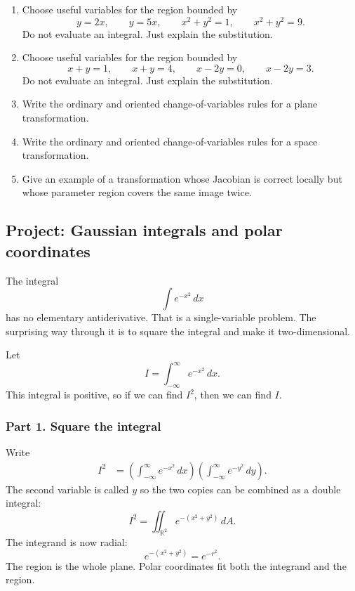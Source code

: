 \begin{enumerate}
\item Choose useful variables for the region bounded by
\[
    y=2x,\qquad y=5x,\qquad x^2+y^2=1,\qquad x^2+y^2=9.
\]
Do not evaluate an integral.  Just explain the substitution.

\item Choose useful variables for the region bounded by
\[
    x+y=1,\qquad x+y=4,\qquad x-2y=0,\qquad x-2y=3.
\]
Do not evaluate an integral.  Just explain the substitution.

\item Write the ordinary and oriented change-of-variables rules for a plane transformation.

\item Write the ordinary and oriented change-of-variables rules for a space transformation.

\item Give an example of a transformation whose Jacobian is correct locally but whose
parameter region covers the same image twice.
\end{enumerate}

\subsection{Project: Gaussian integrals and polar coordinates}

The integral
\[
    \int e^{-x^2}\,dx
\]
has no elementary antiderivative.  That is a single-variable problem.  The surprising
way through it is to square the integral and make it two-dimensional.

Let
\[
    I=\int_{-\infty}^{\infty}e^{-x^2}\,dx.
\]
This integral is positive, so if we can find \(I^2\), then we can find \(I\).

\subsubsection*{Part 1. Square the integral}

Write
\[
\begin{aligned}
I^2
&=
\left(\int_{-\infty}^{\infty}e^{-x^2}\,dx\right)
\left(\int_{-\infty}^{\infty}e^{-y^2}\,dy\right).
\end{aligned}
\]
The second variable is called \(y\) so the two copies can be combined as a double
integral:
\[
\boxed{
I^2
=
\iint_{\mathbb R^2} e^{-(x^2+y^2)}\,dA.
}
\]
The integrand is now radial:
\[
    e^{-(x^2+y^2)}=e^{-r^2}.
\]
The region is the whole plane.  Polar coordinates fit both the integrand and the region.

